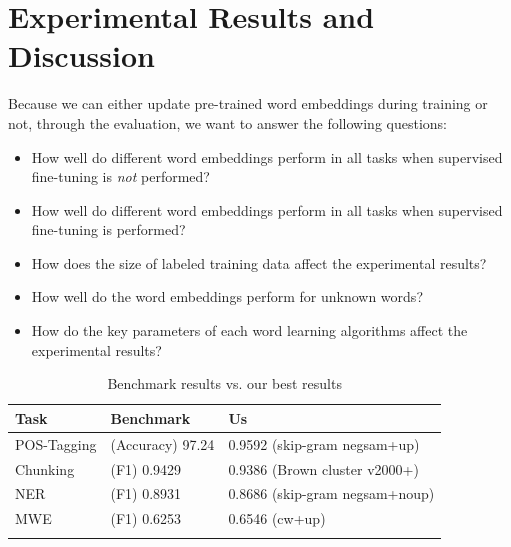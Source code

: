 

\section{Experimental Results and Discussion}

Because we can either update pre-trained word embeddings during training or not, through the evaluation, we want to answer the following questions:
\begin{itemize}
\item How well do different word embeddings perform in all tasks when supervised fine-tuning is \textit{not} performed?
\item How well do different word embeddings perform in all tasks when supervised fine-tuning is performed?
\item How does the size of labeled training data affect the experimental results?
\item How well do the word embeddings perform for unknown words? 
\item How do the key parameters of each word learning algorithms affect the experimental results?
\end{itemize}


\begin{table}
\caption{Benchmark results vs. our best results}
\begin{center}
\begin{small}
\begin{tabular}{lll}
\hline
\textbf{Task} & \textbf{Benchmark} & \textbf{Us} \\ \hline
POS-Tagging & (Accuracy) 97.24 \cite{Toutanova:2003} & 0.9592 (skip-gram negsam+up) \\ 
Chunking & (F1) 0.9429 \cite{Sha:2003} & 0.9386 (Brown cluster v2000+)\\  
NER & (F1) 0.8931 \cite{Ando:2005} & 0.8686 (skip-gram negsam+noup)\\  
MWE & (F1) 0.6253 \cite{Schneider+:2014} & 0.6546 (cw+up)\\ 
\hline
\label{benchmark}
\end{tabular}
\end{small}
\end{center}
\end{table}


